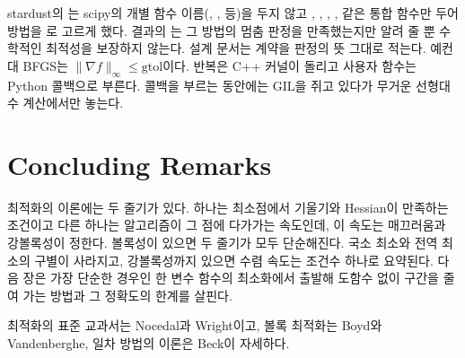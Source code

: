 \begin{instardust}
stardust의 는 scipy의 개별 함수 이름(, ,  등)을 두지 않고 , , , ,  같은 통합 함수만 두어 방법을 로 고르게 했다. 결과의 는 그 방법의 멈춤 판정을 만족했는지만 알려 줄 뿐 수학적인 최적성을 보장하지 않는다. 설계 문서는 계약을 판정의 뜻 그대로 적는다. 예컨대 BFGS는 $\|\nabla f\|_\infty\le\mathrm{gtol}$이다. 반복은 C++ 커널이 돌리고 사용자 함수는 Python 콜백으로 부른다. 콜백을 부르는 동안에는 GIL을 쥐고 있다가 무거운 선형대수 계산에서만 놓는다.
\end{instardust}

\section{Concluding Remarks}

최적화의 이론에는 두 줄기가 있다. 하나는 최소점에서 기울기와 Hessian이 만족하는 조건이고 다른 하나는 알고리즘이 그 점에 다가가는 속도인데, 이 속도는 매끄러움과 강볼록성이 정한다. 볼록성이 있으면 두 줄기가 모두 단순해진다. 국소 최소와 전역 최소의 구별이 사라지고, 강볼록성까지 있으면 수렴 속도는 조건수 하나로 요약된다. 다음 장은 가장 단순한 경우인 한 변수 함수의 최소화에서 출발해 도함수 없이 구간을 줄여 가는 방법과 그 정확도의 한계를 살핀다.

최적화의 표준 교과서는 Nocedal과 Wright\cite{nocedal2006}이고, 볼록 최적화는 Boyd와 Vandenberghe\cite{boyd2004convex}, 일차 방법의 이론은 Beck\cite{beck2017}이 자세하다.

\chapterreferences
